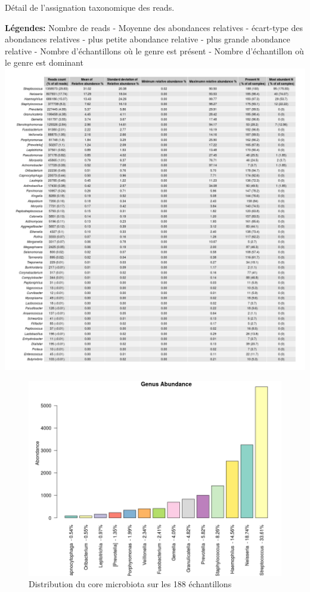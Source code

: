 \documentclass[12pt,a4paper]{article}
\begin{document}
\begin{table}
\begin{center}
\caption{Détail de l'assignation taxonomique des reads.} \textbf{Légendes:} Nombre de reads - Moyenne des abondances relatives - écart-type des abondances relatives - plus petite abondance relative - plus grande abondance relative - Nombre d'échantillons où le genre est présent - Nombre d'échantillon où le genre est dominant
\includegraphics[width=\textwidth]{img/alld.png}\hfill
\end{center}

\label{alltable}
\end{table}


\begin{figure}[t]
\begin{center}
\includegraphics[scale=0.5]{img/core.png}\hfill
\end{center}
\caption{Distribution du core microbiota sur les 188 échantillons}
\label{core}
\end{figure}
\end{document}
